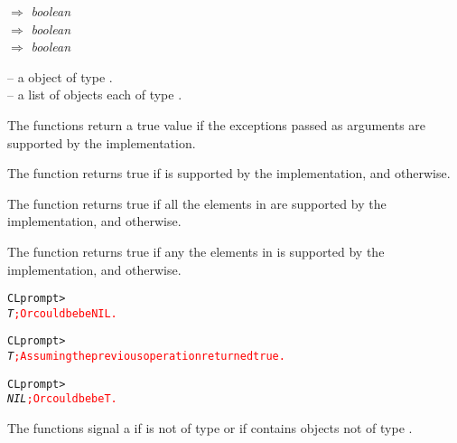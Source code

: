 \documentclass[../Exception-Handling.tex]{subfiles}
\begin{document}

\DSyntax{}

 $\Rightarrow$ \textit{boolean}\\
 
 $\Rightarrow$ \textit{boolean}\\
 
 $\Rightarrow$ \textit{boolean}

\DArgsNValues{}

 -- a \CL{} object of type 
.\\
 -- a list of \CL{} objects each of type 
.


\DDescription{}

The functions return a true value if the exceptions passed as
arguments are supported by the implementation.

The function  returns true if 
 is supported by the implementation, and 
otherwise.

The function  returns true if all the
elements in  are supported by the implementation,
and  otherwise.

The function  returns true if any the
elements in  is supported by the implementation,
and  otherwise.

\DExamples{}

\begin{alltt}
CL prompt> 
\textit{T} \textcolor{red}{; Or could be be NIL.}

CL prompt> 
\textit{T} \textcolor{red}{; Assuming the previous operation returned true.}

CL prompt> 
\textit{NIL} \textcolor{red}{; Or could be be T.}
\end{alltt}

\DExceptional{}

The functions signal a  if 
is not of type  or if  contains
objects not of type .
\end{document}
